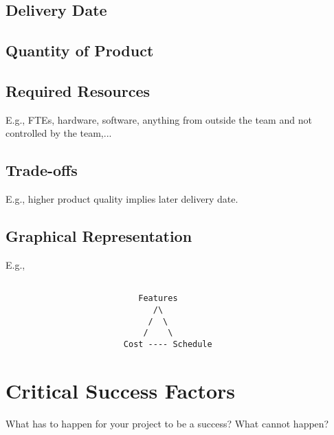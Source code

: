 \documentclass[11pt]{nmemo}
\begin{document}
\subsection*{Delivery Date}

\subsection*{Quantity of Product}

\subsection*{Required Resources}
             E.g., FTEs, hardware, software, anything from outside the
             team and not controlled by the team,...

\subsection*{Trade-offs}
             E.g., higher product quality implies later delivery date.

\subsection*{Graphical Representation}
             E.g.,
             \begin{verbatim}

                           Features
                              /\
                             /  \
                            /    \
                        Cost ---- Schedule

              \end{verbatim}


\newpage
\section*{Critical Success Factors}

What has to happen for your project to be a success?  What cannot
happen?


\end{document}
